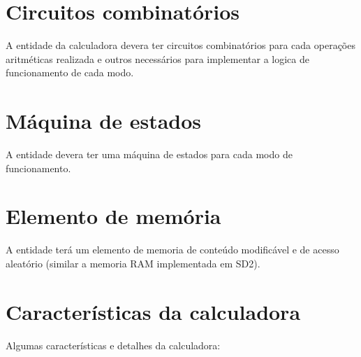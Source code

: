 \documentclass[12pt, a4paper]{article}
\begin{document}
	
	
	\section*{Circuitos combinatórios}
	A entidade da calculadora devera ter circuitos combinatórios para cada operações aritméticas realizada e outros necessários para implementar a 
	logica de funcionamento de cada modo. 
	
	\section*{Máquina de estados}
	A entidade devera ter uma máquina de estados para cada modo de funcionamento. 
	
	\section*{Elemento de memória}
	A entidade terá um elemento de memoria de conteúdo modificável e de acesso aleatório (similar a memoria RAM implementada em SD2).
	
	
	
	\section*{Características da calculadora}
	Algumas características e detalhes da calculadora:
	
\end{document}

